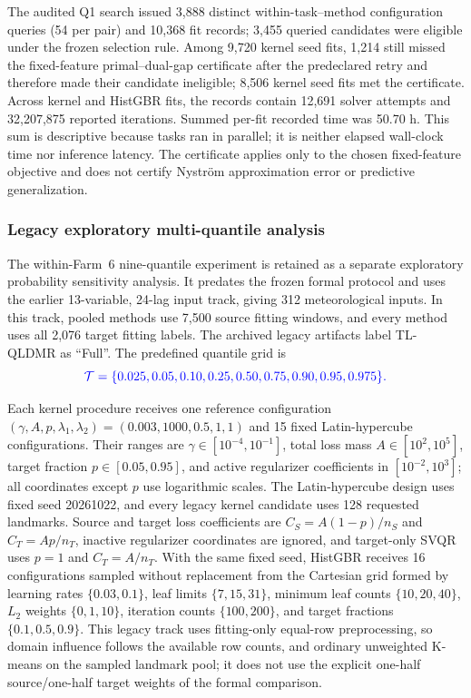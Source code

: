 {\color{blue}The audited Q1 search issued 3,888 distinct within-task--method configuration queries (54 per pair) and 10,368 fit records; 3,455 queried candidates were eligible under the frozen selection rule. Among 9,720 kernel seed fits, 1,214 still missed the fixed-feature primal--dual-gap certificate after the predeclared retry and therefore made their candidate ineligible; 8,506 kernel seed fits met the certificate. Across kernel and HistGBR fits, the records contain 12,691 solver attempts and 32,207,875 reported iterations. Summed per-fit recorded time was 50.70 h. This sum is descriptive because tasks ran in parallel; it is neither elapsed wall-clock time nor inference latency. The certificate applies only to the chosen fixed-feature objective and does not certify Nyström approximation error or predictive generalization.}

\subsubsection{Legacy exploratory multi-quantile analysis}
{\color{blue}The within-Farm~6 nine-quantile experiment is retained as a separate exploratory probability sensitivity analysis. It predates the frozen formal protocol and uses the earlier 13-variable, 24-lag input track, giving 312 meteorological inputs. In this track, pooled methods use 7,500 source fitting windows, and every method uses all 2,076 target fitting labels. The archived legacy artifacts label TL-QLDMR as ``Full''. The predefined quantile grid is}
\begin{equation*}
{\color{blue}\mathcal{T}=\{0.025,0.05,0.10,0.25,0.50,0.75,0.90,0.95,0.975\}.}
\end{equation*}

{\color{blue}Each kernel procedure receives one reference configuration $(\gamma,A,p,\lambda_1,\lambda_2)=(0.003,1000,0.5,1,1)$ and 15 fixed Latin-hypercube configurations. Their ranges are $\gamma\in[10^{-4},10^{-1}]$, total loss mass $A\in[10^2,10^5]$, target fraction $p\in[0.05,0.95]$, and active regularizer coefficients in $[10^{-2},10^3]$; all coordinates except $p$ use logarithmic scales. The Latin-hypercube design uses fixed seed 20261022, and every legacy kernel candidate uses 128 requested landmarks. Source and target loss coefficients are $C_S=A(1-p)/n_S$ and $C_T=Ap/n_T$, inactive regularizer coordinates are ignored, and target-only SVQR uses $p=1$ and $C_T=A/n_T$. With the same fixed seed, HistGBR receives 16 configurations sampled without replacement from the Cartesian grid formed by learning rates $\{0.03,0.1\}$, leaf limits $\{7,15,31\}$, minimum leaf counts $\{10,20,40\}$, $L_2$ weights $\{0,1,10\}$, iteration counts $\{100,200\}$, and target fractions $\{0.1,0.5,0.9\}$. This legacy track uses fitting-only equal-row preprocessing, so domain influence follows the available row counts, and ordinary unweighted K-means on the sampled landmark pool; it does not use the explicit one-half source/one-half target weights of the formal comparison.}

